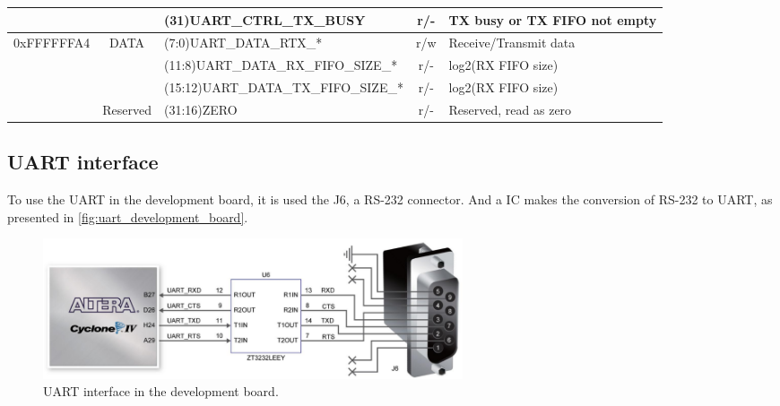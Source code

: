 \begin{table}[!ht]
{\begin{tabular}{ccp{7cm}cp{3cm}}
        			& & (31)UART\_CTRL\_TX\_BUSY & r/- & TX busy or TX FIFO not empty \\
                    \midrule
        			0xFFFFFFA4 & DATA & (7:0)UART\_DATA\_RTX\_* & r/w & Receive/Transmit data \\
        			& & (11:8)UART\_DATA\_RX\_FIFO\_SIZE\_* & r/- & log2(RX FIFO size) \\
        			& & (15:12)UART\_DATA\_TX\_FIFO\_SIZE\_* & r/- & log2(RX FIFO size) \\
        			  & Reserved & (31:16)ZERO & r/- & Reserved, read as zero \\
        			\bottomrule
        		\end{tabular}
        	}
        	\label{tab:uart_registers}
        \end{table}

        \subsection{UART interface}

            To use the UART in the development board, it is used the J6, a RS-232 connector. And a IC makes the conversion of RS-232 to UART, as presented in \autoref{fig:uart_development_board}.  
            
            \begin{figure}[!ht]
                \begin{center}
                    \includegraphics[width= 0.6\textwidth]{figures/uart_development_board.png}
                    \caption{\label{fig:uart_development_board} UART interface in the development board.}
                \end{center}
            \end{figure}